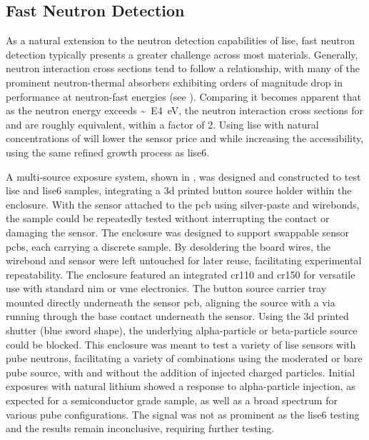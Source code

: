 \documentclass[../../../main.tex]{subfiles}%
\begin{document}
%
    \subsection{Fast Neutron Detection}%
    \label{sec:chapter-4:semiconductor-response:fast-neutron}%
    As a natural extension to the neutron detection capabilities of \gls{lise}, fast neutron detection typically presents a greater challenge across most materials.
    Generally, neutron interaction cross sections tend to follow a  relationship, with many of the prominent \gls{neutron-thermal} absorbers exhibiting orders of magnitude drop in performance at \gls{neutron-fast} energies (see ).
    Comparing  it becomes apparent that as the neutron energy exceeds \SI{E4}[\sim]{\electronvolt}, the neutron interaction cross sections for  and  are roughly equivalent, within a factor of \num{2}.
    Using \gls{lise} with natural concentrations of  will lower the sensor price and while increasing the accessibility, using the same refined growth process as \gls{lise6}.
    \par%
    A multi-source exposure system, shown in  , was designed and constructed to test \gls{lise} and \gls{lise6} samples, integrating a \gls{3d} printed button source holder within the enclosure.
    With the sensor attached to the \gls{pcb} using \gls{silver-paste} and wirebonds, the sample could be repeatedly tested without interrupting the contact or damaging the sensor.
    The enclosure was designed to support swappable sensor \glspl{pcb}, each carrying a discrete sample.
    By desoldering the board wires, the wirebond and sensor were left untouched for later reuse, facilitating experimental repeatability.
    The enclosure featured an integrated \gls{cr110} and \gls{cr150} for versatile use with standard \gls{nim} or \gls{vme} electronics.
    The button source carrier tray mounted directly underneath the sensor \gls{pcb}, aligning the source with a via running through the base contact underneath the sensor.
    Using the \gls{3d} printed shutter (blue sword shape), the underlying \gls{alpha-particle} or \gls{beta-particle} source could be blocked.
    This enclosure was meant to test a variety of \gls{lise} sensors with \gls{pube} neutrons, facilitating a variety of combinations using the moderated or bare \gls{pube} source, with and without the addition of injected charged particles.
    Initial exposures with natural lithium showed a response to \gls{alpha-particle} injection, as expected for a semiconductor grade sample, as well as a broad spectrum for various \gls{pube} configurations.
    The signal was not as prominent as the \gls{lise6} testing and the results remain inconclusive, requiring further testing.
\end{document}
